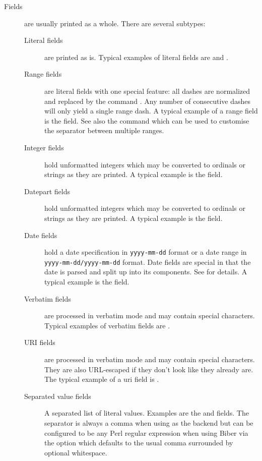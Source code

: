 \documentclass{ltxdockit}[2011/03/25]
\newcommand*{\biber}{Biber\xspace}
\begin{document}
\begin{description}

\item[Fields] are usually printed as a whole. There are several subtypes:

\begin{description}

\item[Literal fields] are printed as is. Typical examples of literal fields are  and .

\item[Range fields] are literal fields with one special feature: all dashes are normalized and replaced by the command . Any number of consecutive dashes will only yield a single range dash. A typical example of a range field is the  field. See also the \BiberOnlyMark{} command which can be used to customise the separator between multiple ranges.

\item[Integer fields] hold unformatted integers which may be converted to ordinals or strings as they are printed. A typical example is the  field.

\item[Datepart fields] hold unformatted integers which may be converted to ordinals or strings as they are printed. A typical example is the  field.

\item[Date fields] hold a date specification in \texttt{yyyy-mm-dd} format or a date range in \texttt{yyyy-mm-dd/yyyy-mm-dd} format. Date fields are special in that the date is parsed and split up into its components. See  for details. A typical example is the  field.

\item[Verbatim fields] are processed in verbatim mode and may contain special characters. Typical examples of verbatim fields are .

\item[URI fields] are processed in verbatim mode and may contain special characters. They are also URL-escaped if they don't look like they already are. The typical example of a uri field is .

\item[Separated value fields] A separated list of literal values. Examples are the  and  fields. The separator is always a comma when using \bibtex as the backend but can be configured to be any Perl regular expression when using \biber via the  option which defaults to the usual \bibtex comma surrounded by optional whitespace.


\end{description}
\end{description}
\end{document}
